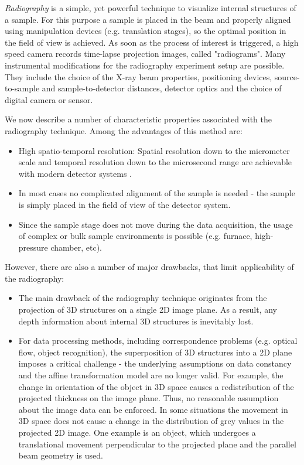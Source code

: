 \textit{Radiography} is a simple, yet powerful technique to visualize internal structures of a sample. For this purpose a sample is placed in the beam and properly aligned using manipulation devices (e.g. translation stages), so the optimal position in the field of view is achieved. As soon as the process of interest is triggered, a high speed camera records time-lapse projection images, called "radiograms". Many instrumental modifications for the radiography experiment setup are possible. They include the choice of the X-ray beam properties, positioning devices, source-to-sample and sample-to-detector distances, detector optics and the choice of digital camera or sensor.

We now describe a number of characteristic properties associated with the radiography technique.
Among the advantages of this method are:
 \begin{itemize}
  \item   High spatio-temporal resolution: Spatial resolution down to the micrometer scale and temporal resolution down to the microsecond range are achievable with modern detector systems \cite{Rack10}.
  \item In most cases no complicated alignment of the sample is needed  - the sample is simply placed in the field of view of the detector system.
  \item Since the sample stage does not move during the data acquisition, the usage of complex or bulk sample environments is possible (e.g. furnace, high-pressure chamber, etc).
\end{itemize}
However, there are also a number of major drawbacks, that limit applicability of the radiography:
 \begin{itemize}
    \item   The main drawback of the radiography technique originates from the projection of 3D structures on a single 2D image plane. As a result, any depth information about internal 3D structures is inevitably lost.
    \item   For data processing methods, including correspondence problems (e.g. optical flow, object recognition), the superposition of 3D structures into a 2D plane imposes a critical challenge - the underlying assumptions on data constancy and the affine transformation model are no longer valid. For example, the change in orientation of the object in 3D space causes a redistribution of the projected thickness on the image plane. Thus, no reasonable assumption about the image data can be enforced. In some situations the movement in 3D space does not cause a change in the distribution of grey values in the projected 2D image. One example is  an object, which undergoes a translational movement perpendicular to the projected plane and the parallel beam geometry is used.         
 \end{itemize}



